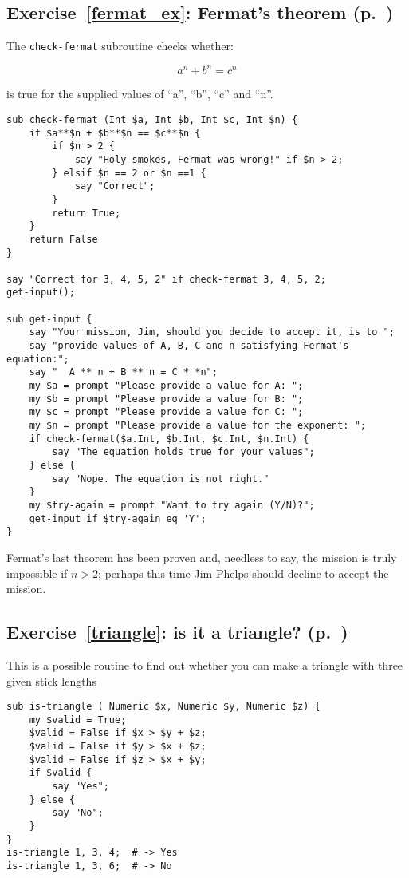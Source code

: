 \subsection{Exercise~\ref{fermat_ex}: Fermat's theorem (p.~\pageref{fermat_ex})}
\label{sol_fermat_ex}

The {\tt check-fermat} subroutine checks whether:

\[ a^n + b^n = c^n \]
%

is true for the supplied values of ``a'', ``b'', ``c'' and 
``n''.

\begin{verbatim}
sub check-fermat (Int $a, Int $b, Int $c, Int $n) {
    if $a**$n + $b**$n == $c**$n {
        if $n > 2 {
            say "Holy smokes, Fermat was wrong!" if $n > 2;
        } elsif $n == 2 or $n ==1 {
            say "Correct";
        }
        return True; 
    }
    return False
}

say "Correct for 3, 4, 5, 2" if check-fermat 3, 4, 5, 2;
get-input();

sub get-input {
    say "Your mission, Jim, should you decide to accept it, is to ";
    say "provide values of A, B, C and n satisfying Fermat's equation:";
    say "  A ** n + B ** n = C * *n";
    my $a = prompt "Please provide a value for A: ";
    my $b = prompt "Please provide a value for B: ";
    my $c = prompt "Please provide a value for C: ";
    my $n = prompt "Please provide a value for the exponent: ";
    if check-fermat($a.Int, $b.Int, $c.Int, $n.Int) {
        say "The equation holds true for your values";
    } else {
        say "Nope. The equation is not right."
    }
    my $try-again = prompt "Want to try again (Y/N)?";
    get-input if $try-again eq 'Y';
}
\end{verbatim}
%

Fermat's last theorem has been proven and, needless to say, 
the mission is truly impossible if $n > 2$; perhaps this 
time Jim Phelps should decline to accept the mission.

\subsection{Exercise~\ref{triangle}: is it a triangle? (p.~\pageref{triangle})}
\label{sol_triangle}

This is a possible routine to find out whether you can 
make a triangle with three given stick lengths

\begin{verbatim}
sub is-triangle ( Numeric $x, Numeric $y, Numeric $z) {
    my $valid = True;
    $valid = False if $x > $y + $z;
    $valid = False if $y > $x + $z;
    $valid = False if $z > $x + $y;
    if $valid {
        say "Yes"; 
    } else {
        say "No";
    }
}
is-triangle 1, 3, 4;  # -> Yes
is-triangle 1, 3, 6;  # -> No
\end{verbatim}

